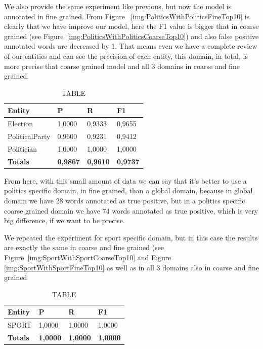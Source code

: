 \documentclass[thesis=M,english]{FITthesis}[2018/05/30]
\begin{document}
	We also provide the same experiment like previous, but now the model is annotated in fine grained. From Figure ~\ref{img:PoliticsWithPoliticsFineTop10} is clearly that we have improve our model, here the F1 value is bigger that in coarse grained (see Figure~\ref{img:PoliticsWithPoliticsCoarseTop10}) and also false positive annotated words are decreased by 1. That means even we have a complete review of our entities and can see the precision of each entity, this domain, in total, is more precise that coarse grained model and all 3 domains in coarse and fine grained.
	\begin{table}[H]\centering
		\caption{TABLE}
		\label{}
		\begin{tabular}{|l|l|l|l|}
			\hline {\textbf{Entity}} & {\textbf{P}} & {\textbf{R}} & {\textbf{F1}}\\\hline
				Election & 1,0000 & 0,9333 & 0,9655\\
				PoliticalParty & 0,9600 & 0,9231 & 0,9412\\
				Politician & 1,0000 & 1,0000 & 1,0000\\\hline
				\textbf{Totals} & \textbf{0,9867} & \textbf{0,9610} & \textbf{0,9737}\\\hline
		\end{tabular}
	\end{table}	

	From here, with this small amount of data we can say that it's better to use a politics specific domain, in fine grained, than a global domain, because in global domain we have 28 words annotated as true positive, but in a politics specific coarse grained domain we have 74 words annotated as true positive, which is very big difference, if we want to be precise.
	
	
	
	We repeated the experiment for sport specific domain, but in this case the results are exactly the same in coarse and fine grained (see Figure~\ref{img:SportWithSportCoarseTop10} and Figure \ref{img:SportWithSportFineTop10} as well as in all 3 domains also in coarse and fine grained
	\begin{table}[H]\centering
		\caption{TABLE}
		\label{}
		\begin{tabular}{|l|l|l|l|}
			\hline {\textbf{Entity}} & {\textbf{P}} & {\textbf{R}} & {\textbf{F1}}\\\hline
				SPORT & 1,0000 & 1,0000 & 1,0000\\\hline
				\textbf{Totals} & \textbf{1,0000} & \textbf{1,0000} & \textbf{1,0000}\\\hline
		\end{tabular}
	\end{table}	
\end{document}

